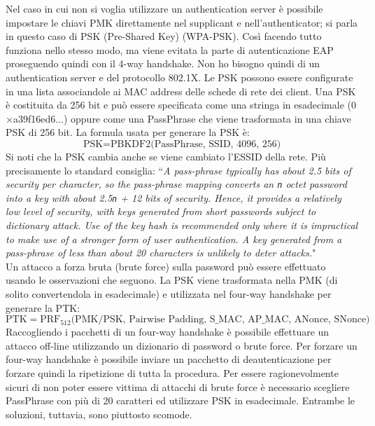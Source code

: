 Nel caso in cui non si voglia utilizzare un authentication server è possibile impostare le chiavi PMK direttamente nel supplicant e nell'authenticator; si parla in questo caso di PSK (Pre-Shared Key) (WPA-PSK). Così facendo tutto funziona nello stesso modo, ma viene evitata la parte di autenticazione EAP proseguendo quindi con il 4-way handshake. Non ho bisogno quindi di un authentication server e del protocollo 802.1X. Le PSK possono essere configurate in una lista associandole ai MAC address delle schede di rete dei client. Una PSK è costituita da 256 bit e può essere specificata come una stringa in esadecimale (0$\times$a39f16ed6$\dots$) oppure come una PassPhrase che viene trasformata in una chiave PSK di 256 bit. La formula usata per generare la PSK è:
$$\text{PSK} = \text{PBKDF2}\text{(PassPhrase, SSID, 4096, 256)}$$
Si noti che la PSK cambia anche se viene cambiato l'ESSID della rete. Più precisamente lo standard consiglia: \textquotedblleft \textit{A pass-phrase typically has about 2.5 bits of security per character, so the pass-phrase mapping converts an \texttt{n} octet password into a key with about 2.5\texttt{n} + 12 bits of security. Hence, it provides a relatively low level of security, with keys generated from short passwords subject to dictionary attack. Use of the key hash is recommended only where it is impractical to make use of a stronger form of user authentication. A key generated from a pass-phrase of less than about 20 characters is unlikely to deter attacks.}"\\

Un attacco a forza bruta (brute force) sulla password può essere effettuato usando le osservazioni che seguono. La PSK viene trasformata nella PMK (di solito convertendola in esadecimale) e utilizzata nel four-way handshake per generare la PTK:
$$\text{PTK} = \text{PRF}_{512}\text{(PMK/PSK, Pairwise Padding, S\_MAC, AP\_MAC, ANonce, SNonce)}$$
Raccogliendo i pacchetti di un four-way handshake è possibile effettuare un attacco off-line utilizzando un dizionario di password o brute force. Per forzare un four-way handshake è possibile inviare un pacchetto di deautenticazione per forzare quindi la ripetizione di tutta la procedura. Per essere ragionevolmente sicuri di non poter essere vittima di attacchi di brute force è necessario scegliere PassPhrase con più di 20 caratteri ed utilizzare PSK in esadecimale. Entrambe le soluzioni, tuttavia, sono piuttosto scomode.\\

